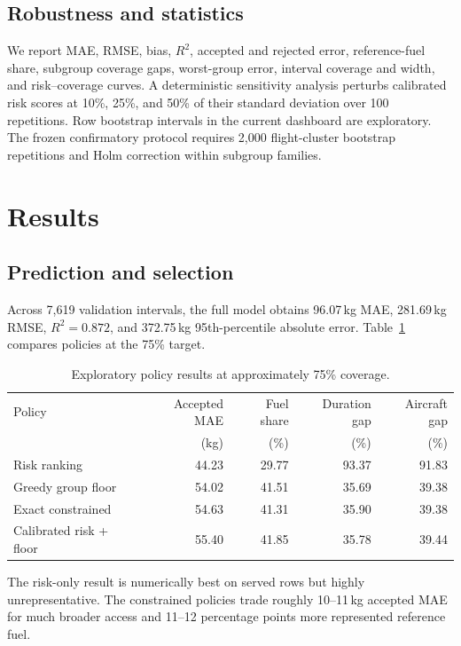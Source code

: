 \documentclass[11pt]{article}
\begin{document}
\subsection{Robustness and statistics}
We report MAE, RMSE, bias, $R^2$, accepted and rejected error, reference-fuel share, subgroup coverage gaps, worst-group error, interval coverage and width, and risk--coverage curves. A deterministic sensitivity analysis perturbs calibrated risk scores at 10\%, 25\%, and 50\% of their standard deviation over 100 repetitions. Row bootstrap intervals in the current dashboard are exploratory. The frozen confirmatory protocol requires 2,000 flight-cluster bootstrap repetitions and Holm correction within subgroup families.

\section{Results}
\subsection{Prediction and selection}
Across 7,619 validation intervals, the full model obtains 96.07\,kg MAE, 281.69\,kg RMSE, $R^2=0.872$, and 372.75\,kg 95th-percentile absolute error. Table~\ref{tab:policy} compares policies at the 75\% target.

\begin{table}[ht]
\centering
\caption{Exploratory policy results at approximately 75\% coverage.}
\label{tab:policy}
\begin{tabular}{lrrrr}
\toprule
Policy & Accepted MAE & Fuel share & Duration gap & Aircraft gap\\
 & (kg) & (\%) & (\%) & (\%)\\
\midrule
Risk ranking & 44.23 & 29.77 & 93.37 & 91.83\\
Greedy group floor & 54.02 & 41.51 & 35.69 & 39.38\\
Exact constrained & 54.63 & 41.31 & 35.90 & 39.38\\
Calibrated risk + floor & 55.40 & 41.85 & 35.78 & 39.44\\
\bottomrule
\end{tabular}
\end{table}

The risk-only result is numerically best on served rows but highly unrepresentative. The constrained policies trade roughly 10--11\,kg accepted MAE for much broader access and 11--12 percentage points more represented reference fuel.
\end{document}
